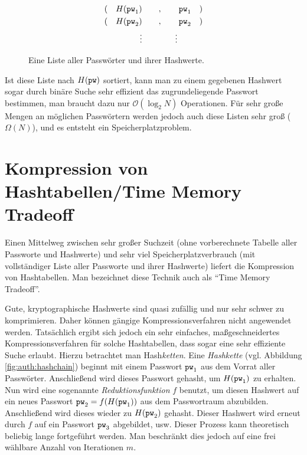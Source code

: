 \begin{figure}[h]
	\begin{align*} (\quad H(\texttt{pw}_1) \qquad&,\qquad \texttt{pw}_1 \quad) \\
(\quad H(\texttt{pw}_2) \qquad&,\qquad \texttt{pw}_2 \quad) \\ \vdots \qquad&\qquad
\vdots
    \end{align*}
    \caption{Eine Liste aller Passwörter und ihrer Hashwerte.}
    \label{fig:auth:listofhashes}
\end{figure}

Ist diese Liste nach $H(\texttt{pw})$ sortiert, kann man zu einem gegebenen
Hashwert sogar durch binäre Suche sehr effizient das zugrundeliegende
Passwort bestimmen, man braucht dazu nur $\mathcal{O}(\log_2 N)$
Operationen. Für sehr große Mengen an möglichen Passwörtern werden
jedoch auch diese Listen sehr groß ($\Omega(N)$), und es entsteht ein
Speicherplatzproblem.

\section{Kompression von Hashtabellen/Time Memory Tradeoff}

Einen Mittelweg zwischen sehr großer Suchzeit (ohne vorberechnete
Tabelle aller Passworte und Hashwerte) und sehr viel
Speicherplatzverbrauch (mit vollständiger Liste aller Passworte und
ihrer Hashwerte) liefert die Kompression von Hashtabellen. Man
bezeichnet diese Technik auch als "`Time Memory Tradeoff"'.

Gute, kryptographische Hashwerte sind quasi zufällig
und nur sehr schwer zu komprimieren. Daher können gängige
Kompressionsverfahren nicht angewendet werden.
Tatsächlich ergibt sich jedoch ein sehr einfaches, maßgeschneidertes
Kompressionsverfahren für solche Hashtabellen, dass sogar eine sehr
effiziente Suche erlaubt.  Hierzu betrachtet man Hash\emph{ketten}.
Eine \emph{Hashkette} (vgl. Abbildung \ref{fig:auth:hashchain}) beginnt
mit einem Passwort $\texttt{pw}_1$ aus dem Vorrat aller Passwörter.
Anschließend wird dieses Passwort gehasht, um $H(\texttt{pw}_1)$ zu erhalten.
Nun wird eine sogenannte \emph{Reduktionsfunktion} $f$ benutzt, um
diesen Hashwert auf ein neues Passwort $\texttt{pw}_2 = f(H(\texttt{pw}_1))$ aus dem
Passwortraum abzubilden.  Anschließend wird dieses wieder zu $H(\texttt{pw}_2)$
gehasht.  Dieser Hashwert wird erneut durch $f$ auf ein Passwort $\texttt{pw}_3$
abgebildet, usw.  Dieser Prozess kann theoretisch beliebig lange
fortgeführt werden. Man beschränkt dies jedoch auf eine frei wählbare
Anzahl von Iterationen $m$.

